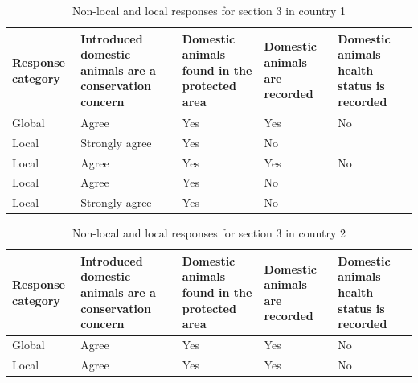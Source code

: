\documentclass[
  letterpaper,
  DIV=11,
  numbers=noendperiod]{scrartcl}
\begin{document}
\begin{table}[H]

\caption{Non-local and local responses for section 3 in country 1}
\centering
\begin{tabular}[t]{>{\raggedright\arraybackslash}p{2cm}|>{\raggedright\arraybackslash}p{3cm}|>{\raggedright\arraybackslash}p{2cm}|>{\raggedright\arraybackslash}p{2cm}|>{\raggedright\arraybackslash}p{2cm}}
\hline
Response
category & Introduced domestic
animals are
a conservation
concern & Domestic animals
found in the
protected area & Domestic animals
are recorded & Domestic animals
health status
is recorded\\
\hline
Global & Agree & Yes & Yes & No\\
\hline
Local & Strongly agree & Yes & No \vphantom{1} & \\
\hline
Local & Agree & Yes & Yes & No\\
\hline
Local & Agree & Yes & No & \\
\hline
Local & Strongly agree & Yes & No & \\
\hline
\end{tabular}
\end{table}

\begin{table}[H]

\caption{Non-local and local responses for section 3 in country 2}
\centering
\begin{tabular}[t]{>{\raggedright\arraybackslash}p{2cm}|>{\raggedright\arraybackslash}p{3cm}|>{\raggedright\arraybackslash}p{2cm}|>{\raggedright\arraybackslash}p{2cm}|>{\raggedright\arraybackslash}p{2cm}}
\hline
Response
category & Introduced domestic
animals are
a conservation
concern & Domestic animals
found in the
protected area & Domestic animals
are recorded & Domestic animals
health status
is recorded\\
\hline
Global & Agree & Yes & Yes & No\\
\hline
Local & Agree & Yes & Yes & No\\
\hline
\end{tabular}
\end{table}
\end{document}
